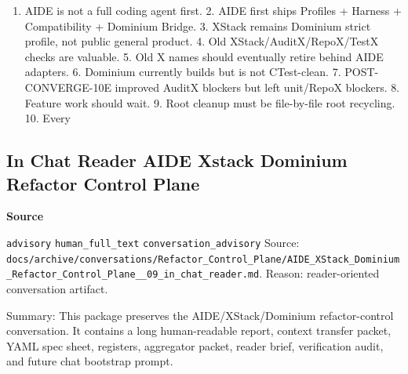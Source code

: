 \documentclass[9pt,a4paper,openany]{book}
\newcommand{\vonecallout}[3]{\par\medskip\noindent\begingroup\setlength{\fboxsep}{7pt}\colorbox{DomCalloutBg}{\parbox{0.94\linewidth}{\textbf{\textcolor{#1}{#2}}\par #3}}\endgroup\par\medskip}
\begin{document}
\begin{enumerate}
\item AIDE is not a full coding agent first.\allowbreak{} 2.\allowbreak{} AIDE first ships Profiles + Harness + Compatibility + Dominium Bridge.\allowbreak{} 3.\allowbreak{} XStack remains Dominium strict profile, not public general product.\allowbreak{} 4.\allowbreak{} Old XStack/\allowbreak{}AuditX/\allowbreak{}RepoX/\allowbreak{}TestX checks are valuable.\allowbreak{} 5.\allowbreak{} Old X names should eventually retire behind AIDE adapters.\allowbreak{} 6.\allowbreak{} Dominium currently builds but is not CTest-\allowbreak{}clean.\allowbreak{} 7.\allowbreak{} POST-\allowbreak{}CONVERGE-\allowbreak{}10E improved AuditX blockers but left unit/\allowbreak{}RepoX blockers.\allowbreak{} 8.\allowbreak{} Feature work should wait.\allowbreak{} 9.\allowbreak{} Root cleanup must be file-\allowbreak{}by-\allowbreak{}file root recycling.\allowbreak{} 10.\allowbreak{} Every
\end{enumerate}


\subsection{In Chat Reader AIDE Xstack Dominium Refactor Control Plane}

\vonecallout{DomSlate}{Source}{\texttt{advisory} \texttt{human\_\allowbreak{}full\_\allowbreak{}text} \texttt{conversation\_\allowbreak{}advisory} Source: \texttt{docs/\allowbreak{}archive/\allowbreak{}conversations/\allowbreak{}Refactor\_\allowbreak{}Control\_\allowbreak{}Plane/\allowbreak{}AIDE\_\allowbreak{}XStack\_\allowbreak{}Dominium\_\allowbreak{}Refactor\_\allowbreak{}Control\_\allowbreak{}Plane\_\allowbreak{}\_\allowbreak{}09\_\allowbreak{}in\_\allowbreak{}chat\_\allowbreak{}reader.\allowbreak{}md}.\allowbreak{} Reason: reader-\allowbreak{}oriented conversation artifact.\allowbreak{}}

Summary: This package preserves the AIDE/\allowbreak{}XStack/\allowbreak{}Dominium refactor-\allowbreak{}control conversation.\allowbreak{} It contains a long human-\allowbreak{}readable report, context transfer packet, YAML spec sheet, registers, aggregator packet, reader brief, verification audit, and future chat bootstrap prompt.\allowbreak{}
\end{document}
